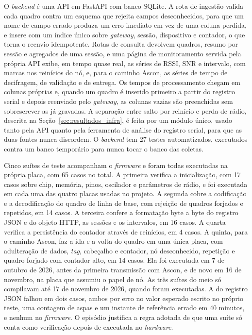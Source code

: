 O \textit{backend} é uma API em FastAPI com banco SQLite. A rota de ingestão valida cada quadro contra um esquema que rejeita campos desconhecidos, para que um nome de campo errado produza um erro imediato em vez de uma coluna perdida, e insere com um índice único sobre \textit{gateway}, sessão, dispositivo e contador, o que torna o reenvio idempotente. Rotas de consulta devolvem quadros, resumo por sessão e agregados de uma sessão, e uma página de monitoramento servida pela própria API exibe, em tempo quase real, as séries de RSSI, SNR e intervalo, com marcas nos reinícios do nó, e, para o caminho Ascon, as séries de tempo de decifragem, de validação e de entrega. Os tempos de processamento chegam em colunas próprias e, quando um quadro é inserido primeiro a partir do registro serial e depois reenviado pelo \textit{gateway}, as colunas vazias são preenchidas sem sobrescrever as já gravadas. A separação entre salto por reinício e perda de rádio, descrita na Seção~\ref{sec:resultados_infra}, é feita por um módulo único, usado tanto pela API quanto pela ferramenta de análise do registro serial, para que as duas fontes nunca discordem. O \textit{backend} tem 27 testes automatizados, executados contra um banco temporário para nunca tocar o banco das coletas.

Cinco suítes de teste acompanham o \textit{firmware} e foram todas executadas na própria placa, com 65 casos no total. A primeira verifica a inicialização, com 17 casos sobre chip, memória, pinos, oscilador e parâmetros de rádio, e foi executada em cada uma das quatro placas usadas no projeto. A segunda cobre a codificação e a decodificação do quadro de linha de base, com rejeição de quadros forjados e repetidos, em 14 casos. A terceira confere a formatação byte a byte do registro JSON e do objeto HTTP, as sessões e os intervalos, em 16 casos. A quarta verifica a persistência do contador através de reinícios, em 4 casos. A quinta, para o caminho Ascon, faz a ida e a volta do quadro em uma única placa, com adulteração de dados, \textit{tag}, cabeçalho e contador, nó desconhecido, repetição e quadro forjado com contador alto, em 14 casos. Ela foi executada em 7 de outubro de 2026, antes da primeira transmissão com Ascon, e de novo em 16 de novembro, na placa que assumiu o papel de nó. As três suítes do meio só compilavam até 17 de novembro de 2026, quando foram executadas. A do registro JSON falhou em dois casos, ambos por erro no valor esperado escrito no próprio teste, uma contagem de aspas e um instante de referência errado em 40 minutos, e nenhum no \textit{firmware}. O episódio justifica a regra adotada de que uma suíte só conta como verificação depois de executada no \textit{hardware}.




